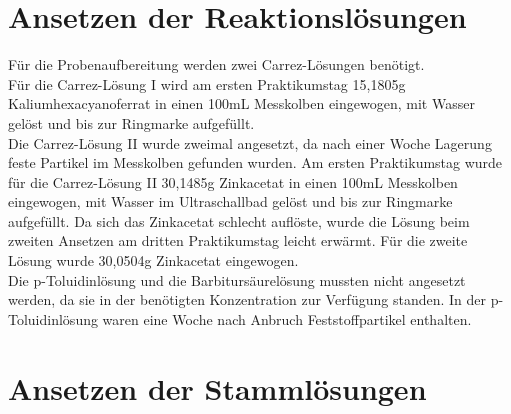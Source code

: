 \section{Ansetzen der Reaktionslösungen}

Für die Probenaufbereitung werden zwei Carrez-Lösungen benötigt.\\ 
Für die Carrez-Lösung I wird am ersten Praktikumstag 15,1805g Kaliumhexacyanoferrat in einen 100mL Messkolben eingewogen, mit Wasser gelöst und bis zur Ringmarke aufgefüllt.\\ 
Die Carrez-Lösung II wurde zweimal angesetzt, da nach einer Woche Lagerung feste Partikel im Messkolben gefunden wurden. Am ersten Praktikumstag wurde für die Carrez-Lösung II 30,1485g Zinkacetat in einen 100mL Messkolben eingewogen, mit Wasser im Ultraschallbad gelöst und bis zur Ringmarke aufgefüllt. Da sich das Zinkacetat schlecht auflöste, wurde die Lösung beim zweiten Ansetzen am dritten Praktikumstag leicht erwärmt. Für die zweite Lösung wurde 30,0504g Zinkacetat eingewogen.\\ 
Die p-Toluidinlösung und die Barbitursäurelösung mussten nicht angesetzt werden, da sie in der benötigten Konzentration zur Verfügung standen. In der p-Toluidinlösung waren eine Woche nach Anbruch Feststoffpartikel enthalten.

\section{Ansetzen der Stammlösungen}

